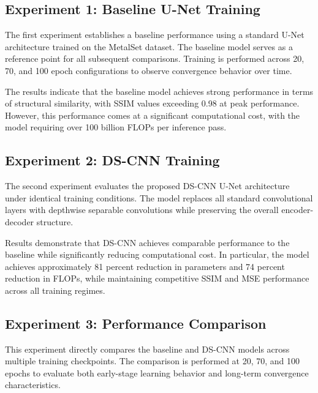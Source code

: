 \documentclass[conference]{IEEEtran}
\begin{document}
\subsection{\textbf{Experiment 1: Baseline U-Net Training}}

The first experiment establishes a baseline performance using a standard U-Net architecture trained on the MetalSet dataset. The baseline model serves as a reference point for all subsequent comparisons. Training is performed across 20, 70, and 100 epoch configurations to observe convergence behavior over time.

The results indicate that the baseline model achieves strong performance in terms of structural similarity, with SSIM values exceeding 0.98 at peak performance. However, this performance comes at a significant computational cost, with the model requiring over 100 billion FLOPs per inference pass.

\subsection{\textbf{Experiment 2: DS-CNN Training}}

The second experiment evaluates the proposed DS-CNN U-Net architecture under identical training conditions. The model replaces all standard convolutional layers with depthwise separable convolutions while preserving the overall encoder-decoder structure.

Results demonstrate that DS-CNN achieves comparable performance to the baseline while significantly reducing computational cost. In particular, the model achieves approximately 81 percent reduction in parameters and 74 percent reduction in FLOPs, while maintaining competitive SSIM and MSE performance across all training regimes.

\subsection{\textbf{Experiment 3: Performance Comparison}}

This experiment directly compares the baseline and DS-CNN models across multiple training checkpoints. The comparison is performed at 20, 70, and 100 epochs to evaluate both early-stage learning behavior and long-term convergence characteristics.
\end{document}
